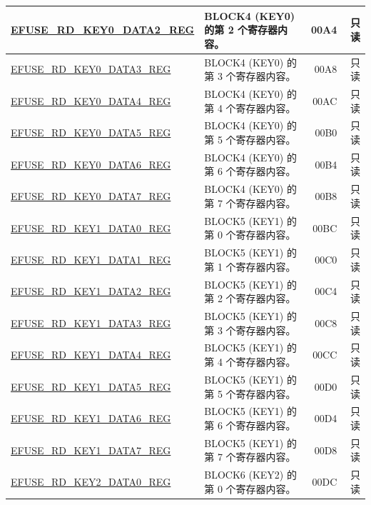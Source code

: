\begin{longtable}{ | m{6cm} |m{7.2cm} | r| r | }
\hyperref[regdesc:EFUSERDKEY0DATANREG]{EFUSE\_RD\_KEY0\_DATA2\_REG} & BLOCK4 (KEY0) 的第 2 个寄存器内容。 & \hexprefix{}00A4 & 只读 \\ \hline
\hyperref[regdesc:EFUSERDKEY0DATANREG]{EFUSE\_RD\_KEY0\_DATA3\_REG} & BLOCK4 (KEY0) 的第 3 个寄存器内容。 & \hexprefix{}00A8 & 只读 \\ \hline
\hyperref[regdesc:EFUSERDKEY0DATANREG]{EFUSE\_RD\_KEY0\_DATA4\_REG} & BLOCK4 (KEY0) 的第 4 个寄存器内容。 & \hexprefix{}00AC & 只读 \\ \hline
\hyperref[regdesc:EFUSERDKEY0DATANREG]{EFUSE\_RD\_KEY0\_DATA5\_REG} & BLOCK4 (KEY0) 的第 5 个寄存器内容。 & \hexprefix{}00B0 & 只读 \\ \hline
\hyperref[regdesc:EFUSERDKEY0DATANREG]{EFUSE\_RD\_KEY0\_DATA6\_REG} & BLOCK4 (KEY0) 的第 6 个寄存器内容。 & \hexprefix{}00B4 & 只读 \\ \hline
\hyperref[regdesc:EFUSERDKEY0DATANREG]{EFUSE\_RD\_KEY0\_DATA7\_REG} & BLOCK4 (KEY0) 的第 7 个寄存器内容。 & \hexprefix{}00B8 & 只读 \\ \hline
\hyperref[regdesc:EFUSERDKEY1DATANREG]{EFUSE\_RD\_KEY1\_DATA0\_REG} & BLOCK5 (KEY1) 的第 0 个寄存器内容。 & \hexprefix{}00BC & 只读 \\ \hline
\hyperref[regdesc:EFUSERDKEY1DATANREG]{EFUSE\_RD\_KEY1\_DATA1\_REG} & BLOCK5 (KEY1) 的第 1 个寄存器内容。 & \hexprefix{}00C0 & 只读 \\ \hline
\hyperref[regdesc:EFUSERDKEY1DATANREG]{EFUSE\_RD\_KEY1\_DATA2\_REG} & BLOCK5 (KEY1) 的第 2 个寄存器内容。 & \hexprefix{}00C4 & 只读 \\ \hline
\hyperref[regdesc:EFUSERDKEY1DATANREG]{EFUSE\_RD\_KEY1\_DATA3\_REG} & BLOCK5 (KEY1) 的第 3 个寄存器内容。 & \hexprefix{}00C8 & 只读 \\ \hline
\hyperref[regdesc:EFUSERDKEY1DATANREG]{EFUSE\_RD\_KEY1\_DATA4\_REG} & BLOCK5 (KEY1) 的第 4 个寄存器内容。 & \hexprefix{}00CC & 只读 \\ \hline
\hyperref[regdesc:EFUSERDKEY1DATANREG]{EFUSE\_RD\_KEY1\_DATA5\_REG} & BLOCK5 (KEY1) 的第 5 个寄存器内容。 & \hexprefix{}00D0 & 只读 \\ \hline
\hyperref[regdesc:EFUSERDKEY1DATANREG]{EFUSE\_RD\_KEY1\_DATA6\_REG} & BLOCK5 (KEY1) 的第 6 个寄存器内容。 & \hexprefix{}00D4 & 只读 \\ \hline
\hyperref[regdesc:EFUSERDKEY1DATANREG]{EFUSE\_RD\_KEY1\_DATA7\_REG} & BLOCK5 (KEY1) 的第 7 个寄存器内容。 & \hexprefix{}00D8 & 只读 \\ \hline
\hyperref[regdesc:EFUSERDKEY2DATANREG]{EFUSE\_RD\_KEY2\_DATA0\_REG} & BLOCK6 (KEY2) 的第 0 个寄存器内容。 & \hexprefix{}00DC & 只读 \\ \hline

\end{longtable}

